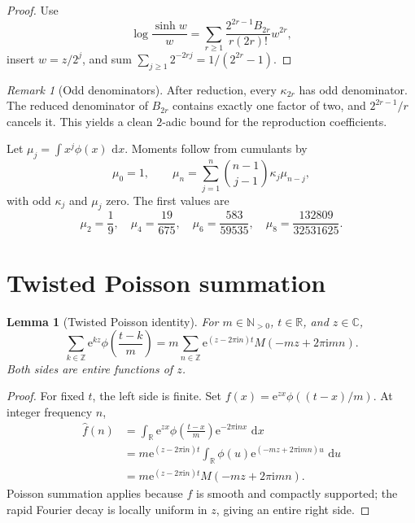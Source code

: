 \documentclass[11pt,oneside]{article}
\newtheorem{lemma}[theorem]{Lemma}
\theoremstyle{definition}
\theoremstyle{remark}
\newtheorem{remark}[theorem]{Remark}
\newcommand{\R}{\mathbb R}
\newcommand{\C}{\mathbb C}
\newcommand{\N}{\mathbb N}
\newcommand{\Z}{\mathbb Z}
\newcommand{\dd}{\,\mathrm d}
\newcommand{\e}{\mathrm e}
\newcommand{\ii}{\mathrm i}
\begin{document}
\begin{proof}
Use
\[
 \log\frac{\sinh w}{w}
 =\sum_{r\ge1}\frac{2^{2r-1}B_{2r}}{r(2r)!}w^{2r},
\]
insert \(w=z/2^j\), and sum
\(\sum_{j\ge1}2^{-2rj}=1/(2^{2r}-1)\).
\end{proof}

\begin{remark}[Odd denominators]
\label{rem:odd-denominators}
After reduction, every \(\kappa_{2r}\) has odd denominator.  The reduced
denominator of \(B_{2r}\) contains exactly one factor of two, and
\(2^{2r-1}/r\) cancels it.  This yields a clean \(2\)-adic bound for the
reproduction coefficients.
\end{remark}

Let \(\mu_j=\int x^j\phi(x)\,\dd x\).  Moments follow from cumulants by
\begin{equation}
 \mu_0=1,\qquad
 \mu_n=\sum_{j=1}^{n}\binom{n-1}{j-1}\kappa_j\mu_{n-j},
 \label{eq:moment-cumulant}
\end{equation}
with odd \(\kappa_j\) and \(\mu_j\) zero.  The first values are
\[
 \mu_2=\frac19,\quad
 \mu_4=\frac{19}{675},\quad
 \mu_6=\frac{583}{59535},\quad
 \mu_8=\frac{132809}{32531625}.
\]

\section{Twisted Poisson summation}
\label{sec:twisted-poisson}

\begin{lemma}[Twisted Poisson identity]
\label{lem:twisted-poisson}
For \(m\in\N_{>0}\), \(t\in\R\), and \(z\in\C\),
\begin{equation}
 \sum_{k\in\Z}\e^{kz}\phi\!\left(\frac{t-k}{m}\right)
 =m\sum_{n\in\Z}\e^{(z-2\pi\ii n)t}
     M(-mz+2\pi\ii mn).
 \label{eq:twisted-poisson}
\end{equation}
Both sides are entire functions of \(z\).
\end{lemma}

\begin{proof}
For fixed \(t\), the left side is finite.  Set
\(f(x)=\e^{zx}\phi((t-x)/m)\).  At integer frequency \(n\),
\begin{align*}
 \widehat f(n)
 &=\int_\R \e^{zx}\phi\!\left(\frac{t-x}{m}\right)
                 \e^{-2\pi\ii nx}\,\dd x\\
 &=m\e^{(z-2\pi\ii n)t}
   \int_\R\phi(u)\e^{(-mz+2\pi\ii mn)u}\,\dd u\\
 &=m\e^{(z-2\pi\ii n)t}M(-mz+2\pi\ii mn).
\end{align*}
Poisson summation applies because \(f\) is smooth and compactly supported; the
rapid Fourier decay is locally uniform in \(z\), giving an entire right side.
\end{proof}
\end{document}

